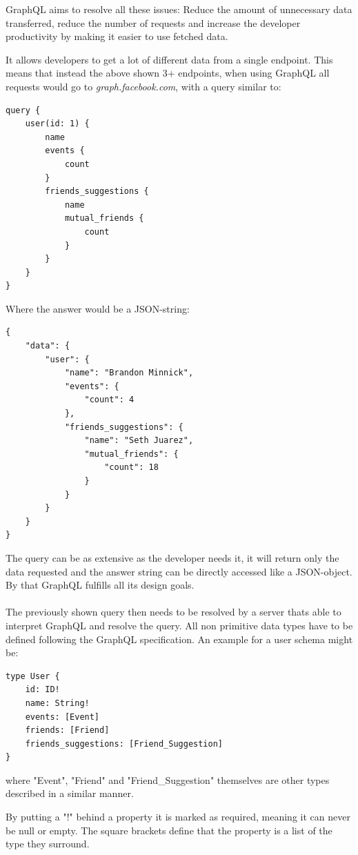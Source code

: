 GraphQL aims to resolve all these issues: Reduce the amount of unnecessary data transferred, reduce the number of requests and increase the developer productivity by making it easier to use fetched data. \cite{EngineeringFB}

It allows developers to get a lot of different data from a single endpoint. This means that instead the above shown 3+ endpoints, when using GraphQL all requests would go to \emph{graph.facebook.com}, with a query similar to:\\
\newpage
\lstset{language=GraphQL}
\begin{lstlisting}[caption={A GraphQL Query to Fetch User Data},label={ex211}]
query {
	user(id: 1) {
		name
		events {
			count
		}
		friends_suggestions {
			name
			mutual_friends {
				count
			}
		}
	}
}
\end{lstlisting}
\citep[with adaptions]{GraphQLIntro}	
Where the answer would be a JSON-string:
\begin{lstlisting}[caption={Example Response Data},label={ex212}]
{ 
	"data": {
		"user": {
			"name": "Brandon Minnick",
			"events": {
				"count": 4
			},
			"friends_suggestions": {
				"name": "Seth Juarez",
				"mutual_friends": {
					"count": 18 
				}
			}
		}
	}
}
\end{lstlisting}
\citep[with adaptions]{GraphQLIntro}	

The query can be as extensive as the developer needs it, it will return only the data requested and the answer string can be directly accessed like a JSON-object. By that GraphQL fulfills all its design goals.
\\ \\
The previously shown query then needs to be resolved by a server thats able to interpret GraphQL and resolve the query. All non primitive data types have to be defined following the GraphQL specification. An example for a user schema might be:
\newpage
\begin{lstlisting}[caption={Type Definition in GraphQL}]
type User {
	id: ID! 
	name: String! 
	events: [Event] 
	friends: [Friend] 
	friends_suggestions: [Friend_Suggestion] 
}
\end{lstlisting}

\noindent
where "Event", "Friend" and "Friend\_Suggestion" themselves are other types described in a similar manner.

By putting a "!" behind a property it is marked as required, meaning it can never be null or empty. The square brackets define that the property is a list of the type they surround.

